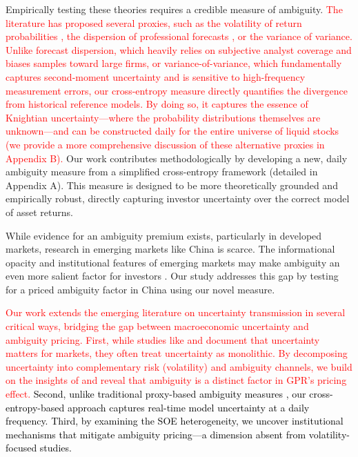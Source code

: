 \documentclass[preprint,12pt,authoryear]{elsarticle}
\begin{document}
Empirically testing these theories requires a credible measure of ambiguity. \textcolor{red}{The literature has proposed several proxies, such as the volatility of return probabilities \citep{Brenner2018}, the dispersion of professional forecasts \citep{Ulrich2013}, or the variance of variance.} \textcolor{red}{Unlike forecast dispersion, which heavily relies on subjective analyst coverage and biases samples toward large firms, or variance-of-variance, which fundamentally captures second-moment uncertainty and is sensitive to high-frequency measurement errors, our cross-entropy measure directly quantifies the divergence from historical reference models. By doing so, it captures the essence of Knightian uncertainty---where the probability distributions themselves are unknown---and can be constructed daily for the entire universe of liquid stocks (we provide a more comprehensive discussion of these alternative proxies in Appendix B).} Our work contributes methodologically by developing a new, daily ambiguity measure from a simplified cross-entropy framework (detailed in Appendix A). This measure is designed to be more theoretically grounded and empirically robust, directly capturing investor uncertainty over the correct model of asset returns.

While evidence for an ambiguity premium exists, particularly in developed markets, research in emerging markets like China is scarce. The informational opacity and institutional features of emerging markets may make ambiguity an even more salient factor for investors \citep{Easley2009}. Our study addresses this gap by testing for a priced ambiguity factor in China using our novel measure.

\textcolor{red}{Our work extends the emerging literature on uncertainty transmission in several critical ways, bridging the gap between macroeconomic uncertainty and ambiguity pricing. First, while studies like \citet{Baker2016} and \citet{Caldara2022} document that uncertainty matters for markets, they often treat uncertainty as monolithic. By decomposing uncertainty into complementary risk (volatility) and ambiguity channels, we build on the insights of \citet{Brenner2018} and reveal that ambiguity is a distinct factor in GPR's pricing effect.} \textcolor{black}{Second, unlike traditional proxy-based ambiguity measures \citep{Brenner2018}, our cross-entropy-based approach captures real-time model uncertainty at a daily frequency. Third, by examining the SOE heterogeneity, we uncover institutional mechanisms that mitigate ambiguity pricing---a dimension absent from volatility-focused studies.}
\end{document}
